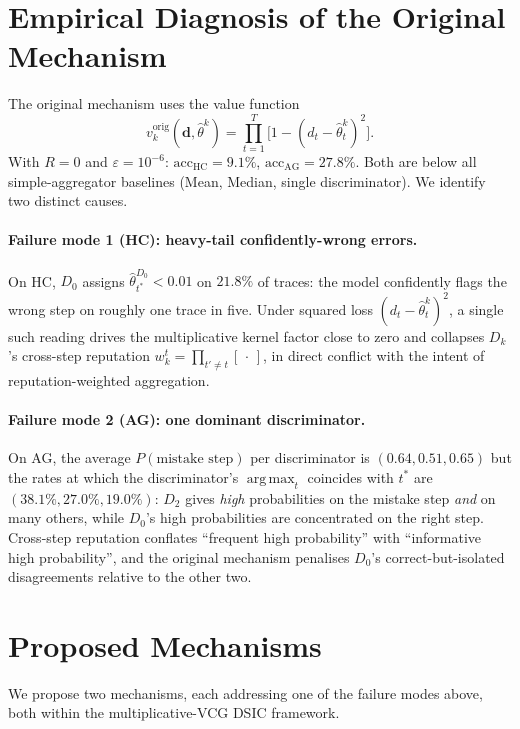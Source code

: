 \documentclass[11pt]{article}
\DeclareMathOperator*{\argmax}{arg\,max}
\newcommand{\thetahat}{\hat{\theta}}
\newcommand{\db}{\bm{d}}
\begin{document}
\section{Empirical Diagnosis of the Original Mechanism}
\label{sec:diagnosis}

The original mechanism uses the value function
\[
v_k^{\text{orig}}(\db, \thetahat^k) = \prod_{t=1}^T \big[1 - (d_t - \thetahat^k_t)^2\big].
\]
With $R = 0$ and $\varepsilon = 10^{-6}$:
$\mathrm{acc}_{\text{HC}} = 9.1\%$, $\mathrm{acc}_{\text{AG}} = 27.8\%$.
Both are below all simple-aggregator baselines (Mean, Median, single
discriminator). We identify two distinct causes.

\paragraph{Failure mode 1 (HC): heavy-tail confidently-wrong errors.}
On HC, $D_0$ assigns $\thetahat^{D_0}_{t^*} < 0.01$ on $21.8\%$ of traces:
the model confidently flags the wrong step on roughly one trace in five.
Under squared loss $(d_t - \thetahat^k_t)^2$, a single such reading drives
the multiplicative kernel factor close to zero and collapses
$D_k$'s cross-step reputation $w^t_k = \prod_{t' \neq t} [\,\cdot\,]$, in
direct conflict with the intent of reputation-weighted aggregation.

\paragraph{Failure mode 2 (AG): one dominant discriminator.}
On AG, the average $P(\text{mistake step})$ per discriminator is
$(0.64, 0.51, 0.65)$ but the rates at which the discriminator's
$\argmax_t$ coincides with $t^*$ are $(38.1\%, 27.0\%, 19.0\%)$: $D_2$
gives \emph{high} probabilities on the mistake step \emph{and} on many
others, while $D_0$'s high probabilities are concentrated on the right
step. Cross-step reputation conflates ``frequent high probability'' with
``informative high probability'', and the original mechanism penalises
$D_0$'s correct-but-isolated disagreements relative to the other two.

\section{Proposed Mechanisms}
\label{sec:mechanisms}

We propose two mechanisms, each addressing one of the failure modes
above, both within the multiplicative-VCG DSIC framework.
\end{document}
